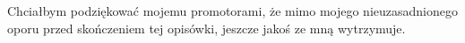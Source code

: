 Chciałbym podziękować mojemu promotorami, że mimo mojego nieuzasadnionego oporu przed skończeniem tej opisówki, jeszcze jakoś ze mną wytrzymuje.